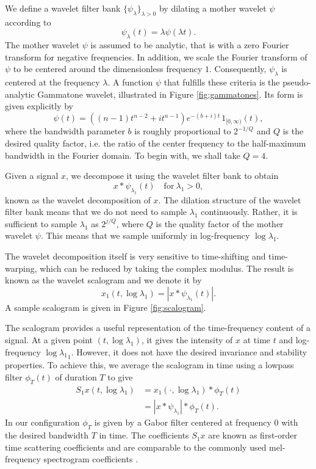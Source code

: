 \documentclass{article}
\newcommand{\lau}{{\lambda_1}}
\begin{document}
\begin{sloppy}
We define a wavelet filter bank $\{\psi_\lambda\}_{\lambda>0}$ by dilating a mother wavelet $\psi$ according to
\begin{equation}
	\psi_\lambda(t) = \lambda \psi(\lambda t).
\end{equation}
The mother wavelet $\psi$ is assumed to be analytic, that is with a zero Fourier transform for negative frequencies. In addition, we scale the Fourier transform of $\psi$ to be centered around the dimensionless frequency $1$. Consequently, $\psi_\lambda$ is centered at the frequency $\lambda$. A function $\psi$ that fulfills these criteria is the pseudo-analytic Gammatone wavelet, illustrated in Figure \ref{fig:gammatones}. Its form is given explicitly by
\begin{equation}
	\psi(t) = ((n-1)t^{n-2}+ i t^{n-1})e^{-(b + i) t}\, 1_{[0,\infty)}(t),
\end{equation}
where the bandwidth parameter $b$ is roughly proportional to $2^{-1/Q}$ and $Q$ is the desired quality factor, i.e. the ratio of the center frequency to the half-maximum bandwidth in the Fourier domain. To begin with, we shall take $Q = 4$.

Given a signal $x$, we decompose it using the wavelet filter bank to obtain
\begin{equation}
	x \ast \psi_\lau(t) \quad \mathrm{for~}\lau>0,
\end{equation}
known as the wavelet decomposition of $x$. The dilation structure of the wavelet filter bank means that we do not need to sample $\lau$ continuously. Rather, it is sufficient to sample $\lau$ as $2^{j/Q}$, where $Q$ is the quality factor of the mother wavelet $\psi$. This means that we sample uniformly in log-frequency $\log \lau$.

The wavelet decomposition itself is very sensitive to time-shifting and time-warping, which can be reduced by taking the complex modulus. The result is known as the wavelet scalogram and we denote it by
\begin{equation}
	x_1(t, \log \lau) = | x \ast \psi_\lau(t) |.
\end{equation}
A sample scalogram is given in Figure \ref{fig:scalogram}.

The scalogram provides a useful representation of the time-frequency content of a signal. At a given point $(t, \log \lau)$, it gives the intensity of $x$ at time $t$ and log-frequency $\log \lau_1$. However, it does not have the desired invariance and stability properties. To achieve this, we average the scalogram in time using a lowpass filter $\phi_T(t)$ of duration $T$ to give
\begin{align}
	\nonumber
	S_1 x(t, \log \lau) &= x_1(\cdot, \log \lau) \ast \phi_T(t) \\
	&= | x \ast \psi_\lau | \ast \phi_T(t).
\end{align}
In our configuration $\phi_T$ is given by a Gabor filter centered at frequency $0$ with the desired bandwidth $T$ in time. The coefficients $S_1 x$ are known as first-order time scattering coefficients and are comparable to the commonly used mel-frequency spectrogram coefficients \cite{davis-mermelstein}.


\end{sloppy}
\end{document}
